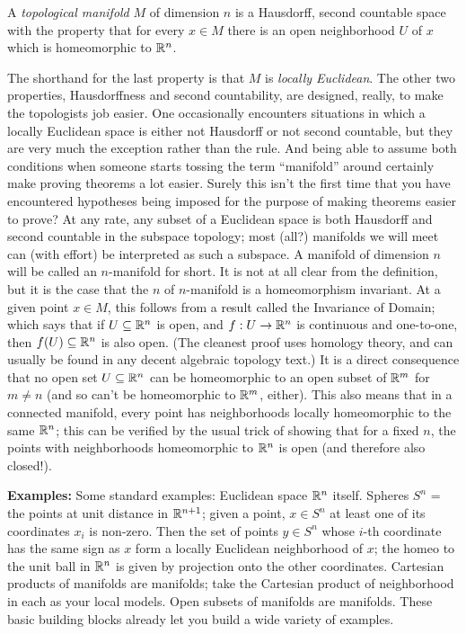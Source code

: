 \msk

A {\it topological manifold} $M$ of dimension $n$ is a Hausdorff, second countable
space with the property that for every $x\in M$ there is an open neighborhood $U$ of
$x$ which is homeomorphic to ${\Bbb R}^n$.

\msk

The shorthand for the last property is that $M$ is {\it locally Euclidean}. The other
two properties, Hausdorffness and second countability, are designed, really, to make 
the topologists job easier. One occasionally encounters situations in which a locally
Euclidean space is either not Hausdorff or not second countable, but they are very
much the exception rather than the rule. And being able to assume both conditions
when someone starts tossing the term ``manifold'' around certainly make proving theorems
a lot easier. Surely this isn't the first time that you have encountered hypotheses
being imposed for the purpose of making theorems easier to prove? At any rate, any
subset of a Euclidean space is both Hausdorff and second countable in the subspace 
topology; most (all?) manifolds we will meet can (with effort) be interpreted as 
such a subspace. A manifold of dimension $n$ will be called an $n$-manifold for short.
It is not at all clear from the definition, but it is the case that the $n$ of $n$-manifold
is a homeomorphism invariant. At a given point $x\in M$, this follows from a result 
called the Invariance of Domain;
which says that if $U\subseteq {\Bbb R}^n$ is open, and $f:U\rightarrow {\Bbb R}^n$ is 
continuous and one-to-one, then $f(U)\subseteq {\Bbb R}^n$ is also open. (The cleanest proof
uses homology theory, and can usually be found in any decent algebraic topology text.)
It is a direct consequence that no open set $U\subseteq {\Bbb R}^n$ can be homeomorphic to 
an open subset of ${\Bbb R}^m$ for $m\neq n$ (and so can't be homeomorphic to ${\Bbb R}^m$, either).
This also means that in a connected manifold, every point has neighborhoods locally
homeomorphic to the same ${\Bbb R}^n$; this can be verified by the usual trick of showing that
for a fixed $n$, the points with neighborhoods homeomorphic to ${\Bbb R}^n$ is open (and 
therefore also closed!).

\msk

{\bf Examples:} Some standard examples: Euclidean space ${\Bbb R}^n$ itself. Spheres $S^n$ = the points
at unit distance in ${\Bbb R}^{n+1}$; given a point, $x\in S^n$ at least one of its
coordinates $x_i$ is non-zero. Then the set of points $y\in S^n$ whose $i$-th 
coordinate has the same sign as $x$ form a locally Euclidean neighborhood of $x$;
the homeo to the unit ball in ${\Bbb R}^n$ is given by projection onto the other
coordinates. Cartesian products of manifolds are manifolds; take the Cartesian
product of neighborhood in each as your local models. Open subsets of
manifolds are manifolds. These basic building blocks already let you build
a wide variety of examples.

